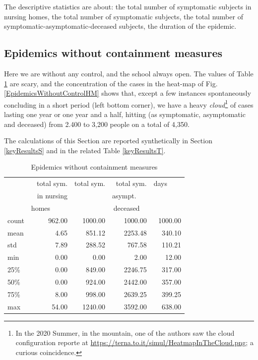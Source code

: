 \documentclass[11pt]{article}
\begin{document}
The descriptive statistics are about: the total number of symptomatic subjects in nursing homes, the total number of symptomatic subjects, the total number of symptomatic-asymptomatic-deceased subjects, the duration of the epidemic.

\subsection{Epidemics without containment measures}
\label{EpidemicsWithoutControlS}

Here we are without any control, and the school always open. The values of Table \ref{EpidemicsWithoutControlT} are scary, and the concentration of the cases in the heat-map of Fig. \ref{EpidemicsWithoutControlHM} shows that, except a few instances spontaneously concluding in a short period (left bottom corner), we have a heavy \emph{cloud}\footnote{In the 2020 Summer, in the mountain, one of the authors saw the cloud configuration reporte at \url{https://terna.to.it/simul/HeatmapInTheCloud.png}; a curious coincidence.} of cases lasting one year or one year and a half, hitting (as symptomatic, asymptomatic and deceased) from 2.400 to 3,200 people on a total of 4,350.

The calculations of this Section are reported synthetically in Section \ref{keyResultsS} and in the related Table \ref{keyResultsT}.

\begin{table}[H]
\center
\small
\begin{tabular}{lrrrr}
\toprule
{} & total sym.        &  total sym. & total sym.     & days~~~~ \\
{} & in nursing        &                  & asympt.~~~  & \\
{} & homes~~~~~  &                  & deceased~~ & \\
\midrule
count &     962.00 &             1000.00 &                 1000.00 & 1000.00 \\
mean  &       4.65 &              851.12 &                 2253.48 &  340.10 \\
std   &       7.89 &              288.52 &                  767.58 &  110.21 \\
min   &       0.00 &                0.00 &                    2.00 &   12.00 \\
25\%   &       0.00 &              849.00 &                 2246.75 &  317.00 \\
50\%   &       0.00 &              924.00 &                 2442.00 &  357.00 \\
75\%   &       8.00 &              998.00 &                 2639.25 &  399.25 \\
max   &      54.00 &             1240.00 &                 3592.00 &  638.00 \\
\bottomrule
\end{tabular}

\label{EpidemicsWithoutControlT}
\caption{Epidemics without containment measures}
\end{table}
\end{document}
